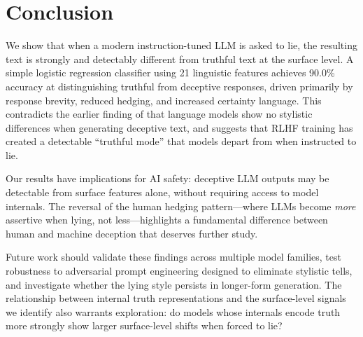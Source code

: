 \section{Conclusion}
\label{sec:conclusion}

We show that when a modern instruction-tuned LLM is asked to lie, the resulting text is strongly and detectably different from truthful text at the surface level.
A simple logistic regression classifier using 21 linguistic features achieves 90.0\% accuracy at distinguishing truthful from deceptive responses, driven primarily by response brevity, reduced hedging, and increased certainty language.
This contradicts the earlier finding of \citet{schuster2019limitations} that language models show no stylistic differences when generating deceptive text, and suggests that RLHF training has created a detectable ``truthful mode'' that models depart from when instructed to lie.

Our results have implications for AI safety: deceptive LLM outputs may be detectable from surface features alone, without requiring access to model internals.
The reversal of the human hedging pattern---where LLMs become \emph{more} assertive when lying, not less---highlights a fundamental difference between human and machine deception that deserves further study.

Future work should validate these findings across multiple model families, test robustness to adversarial prompt engineering designed to eliminate stylistic tells, and investigate whether the lying style persists in longer-form generation.
The relationship between internal truth representations \citep{burger2024truth} and the surface-level signals we identify also warrants exploration: do models whose internals encode truth more strongly show larger surface-level shifts when forced to lie?
